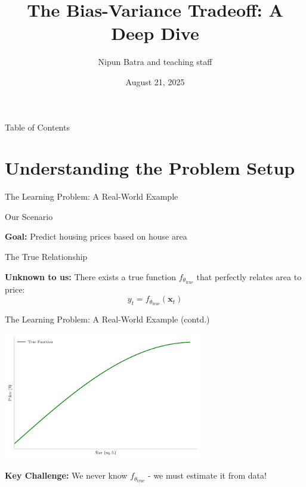 \documentclass[10pt]{beamer}
\title{The Bias-Variance Tradeoff: A Deep Dive}
\date{August 21, 2025}
\author{Nipun Batra and teaching staff}
\institute{IIT Gandhinagar}
\newcommand{\fitpic}[1]{\begin{adjustbox}{max width=\linewidth, max totalheight=0.78\textheight}#1\end{adjustbox}}
\begin{document}
\maketitle

\begin{frame}{Table of Contents}
\tableofcontents
\end{frame}

\section{Understanding the Problem Setup}


\begin{frame}{The Learning Problem: A Real-World Example}
\footnotesize
\begin{definitionbox}{Our Scenario}
\raggedright
\textbf{Goal:} Predict housing prices based on house area
\end{definitionbox}

\begin{examplebox}{The True Relationship}
\raggedright
\textbf{Unknown to us:} There exists a true function $f_{\theta_{\text{true}}}$ that perfectly relates area to price:
$$y_t = f_{\theta_{\text{true}}}(\mathbf{x}_t)$$
\end{examplebox}
\end{frame}

\begin{frame}{The Learning Problem: A Real-World Example (contd.)}
\footnotesize
\begin{center}
\fitpic{\includegraphics[width=0.65\textwidth]{../assets/bias-variance/figures/true.pdf}}
\end{center}

\begin{keypointsbox}
\raggedright
\textbf{Key Challenge:} We never know $f_{\theta_{\text{true}}}$ - we must estimate it from data!
\end{keypointsbox}
\end{frame}
\end{document}
